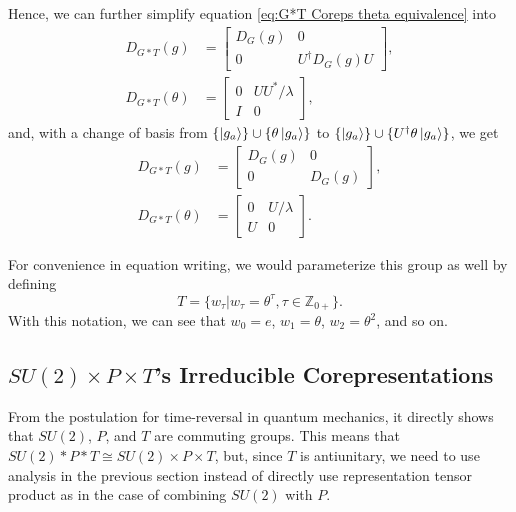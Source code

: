\documentclass[preprint, 12pt]{revtex4-2}
\numberwithin{equation}{section}
\begin{document}
Hence, we can further simplify equation \ref{eq:G*T Coreps theta equivalence} into
\begin{equation}\label{eq:G*T Coreps simplify}
    \begin{aligned}
        D_{G\ast T}(g) &=   \begin{bmatrix}
                                D_{G}(g) & 0 \\
                                0 & U^\dagger D_G(g)U  
                            \end{bmatrix}, \\
        D_{G\ast T}(\theta) &=  \begin{bmatrix}
                                    0 & UU^\ast/\lambda \\
                                    I & 0 
                                \end{bmatrix},
    \end{aligned}
\end{equation}
and, with a change of basis from $\{\ket{g_a}\}\cup\{\theta\ket{g_a}\}$ to $\{\ket{g_a}\}\cup\{U^\dagger\theta\ket{g_a}\}$, we get
\begin{equation}\label{eq:G*T Coreps simplify change basis}
    \begin{aligned}
        D_{G\ast T}(g) &=   \begin{bmatrix}
                                D_{G}(g) & 0 \\
                                0 & D_G(g)  
                            \end{bmatrix}, \\
        D_{G\ast T}(\theta) &=  \begin{bmatrix}
                                    0 & U/\lambda \\
                                    U & 0 
                                \end{bmatrix}.
    \end{aligned}
\end{equation}

For convenience in equation writing, we would parameterize this group as well by defining
\begin{equation}\label{eq:T parameterization}
    T = \{w_\tau|w_\tau=\theta^\tau,\tau\in\mathbb{Z}_{0+}\}.
\end{equation}
With this notation, we can see that $w_0=e$, $w_1=\theta$, $w_2=\theta^2$, and so on.

\subsection{$SU(2)\times P\times T$'s Irreducible Corepresentations}
From the postulation for time-reversal in quantum mechanics, it directly shows that $SU(2)$, $P$, and $T$ are commuting groups. This means that $SU(2)\ast P\ast T\cong SU(2)\times P\times T$, but, since $T$ is antiunitary, we need to use analysis in the previous section instead of directly use representation tensor product as in the case of combining $SU(2)$ with $P$.
\end{document}
